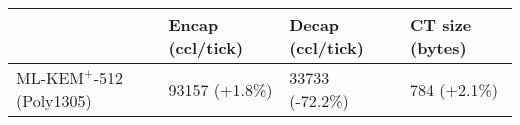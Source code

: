 \documentclass[journal=tches,submission]{iacrtrans}
\def\mlkemplus{\text{ML-KEM}^+}
\begin{document}
\begin{table}[h]
    \centering
    \small

    \begin{tabular}{|p{2.5cm}|p{1.4cm}|p{1.4cm}|p{1.4cm}|}
       \hline
       & Encap \newline (ccl/tick) 
       & Decap \newline (ccl/tick) 
       & CT size \newline (bytes) \\
       \hline
       $\mlkemplus$-512 \newline (Poly1305)
       & 93157 \newline (+1.8\%)
       & 33733 \newline (-72.2\%)
       & 784 \newline (+2.1\%) \\
       \hline

\end{tabular}
\end{table}
\end{document}
